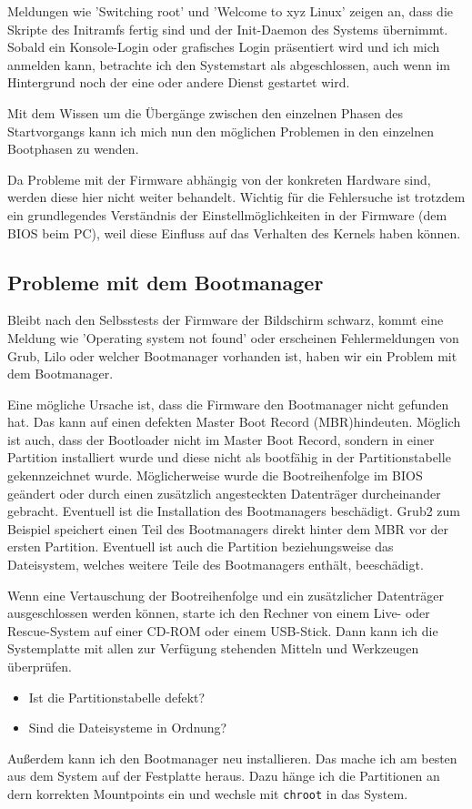Meldungen wie 'Switching root' und 'Welcome to xyz Linux' zeigen an, dass die
Skripte des Initramfs fertig sind und der Init-Daemon des Systems übernimmt.
Sobald ein Konsole-Login oder grafisches Login präsentiert wird und ich mich
anmelden kann, betrachte ich den Systemstart als abgeschlossen, auch wenn im
Hintergrund noch der eine oder andere Dienst gestartet wird.

Mit dem Wissen um die Übergänge zwischen den einzelnen Phasen des
Startvorgangs kann ich mich nun den möglichen Problemen in den einzelnen
Bootphasen zu wenden.

Da Probleme mit der Firmware abhängig von der konkreten Hardware sind, werden
diese hier nicht weiter behandelt. Wichtig für die Fehlersuche ist trotzdem
ein grundlegendes Verständnis der Einstellmöglichkeiten in der Firmware (dem
BIOS beim PC), weil diese Einfluss auf das Verhalten des Kernels haben können.

\subsection{Probleme mit dem Bootmanager}

Bleibt nach den Selbsstests der Firmware der Bildschirm schwarz, kommt eine
Meldung wie 'Operating system not found' oder erscheinen Fehlermeldungen von
Grub, Lilo oder welcher Bootmanager vorhanden ist, haben wir ein Problem mit
dem Bootmanager.

Eine mögliche Ursache ist, dass die Firmware den Bootmanager nicht gefunden
hat. Das kann auf einen defekten Master Boot Record (MBR)hindeuten. Möglich
ist auch, dass der Bootloader nicht im Master Boot Record, sondern in einer
Partition installiert wurde und diese nicht als bootfähig in der
Partitionstabelle gekennzeichnet wurde. Möglicherweise wurde die
Bootreihenfolge im BIOS geändert oder durch einen zusätzlich angesteckten
Datenträger durcheinander gebracht. Eventuell ist die Installation des
Bootmanagers beschädigt. Grub2 zum Beispiel speichert einen Teil des
Bootmanagers direkt hinter dem MBR vor der ersten Partition. Eventuell ist
auch die Partition beziehungsweise das Dateisystem, welches weitere Teile des
Bootmanagers enthält, beeschädigt.

Wenn eine Vertauschung der Bootreihenfolge und ein zusätzlicher Datenträger
ausgeschlossen werden können, starte ich den Rechner von einem Live- oder
Rescue-System auf einer CD-ROM oder einem USB-Stick. Dann kann ich die
Systemplatte mit allen zur Verfügung stehenden Mitteln und Werkzeugen
überprüfen.
\begin{itemize}
  \item Ist die Partitionstabelle defekt?
  \item Sind die Dateisysteme in Ordnung?
\end{itemize}
Außerdem kann ich den Bootmanager neu installieren. Das mache ich am besten
aus dem System auf der Festplatte heraus. Dazu hänge ich die Partitionen an
dern korrekten Mountpoints ein und wechsle mit \verb?chroot? in das System.

